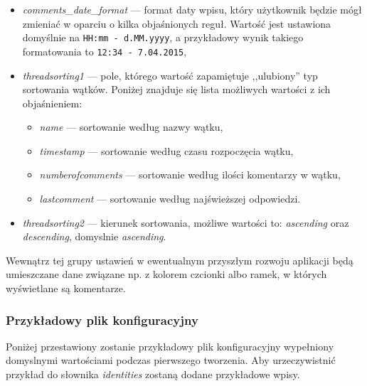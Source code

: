 \documentclass[polish,a4paper,twoside]{ppfcmthesis}
\begin{document}
\begin{itemize}[noitemsep]
  \item \emph{comments\_date\_format} --- format daty wpisu, który użytkownik będzie mógł zmieniać w oparciu o kilka objaśnionych reguł. Wartość jest ustawiona domyślnie na \texttt{HH:mm - d.MM.yyyy}, a przykładowy wynik takiego formatowania to \texttt{12:34 - 7.04.2015},
  \item \emph{threadsorting1} --- pole, którego wartość zapamiętuje ,,ulubiony'' typ sortowania wątków. Poniżej znajduje się lista możliwych wartości z ich objaśnieniem:
  
  \begin{itemize}[noitemsep]
    \item \emph{name} --- sortowanie według nazwy wątku,
    \item \emph{timestamp} --- sortowanie według czasu rozpoczęcia wątku,
    \item \emph{numberofcomments} --- sortowanie według ilości komentarzy w wątku,
    \item \emph{lastcomment} --- sortowanie według najświeższej odpowiedzi.
  \end{itemize}
  
  \item \emph{threadsorting2} --- kierunek sortowania, możliwe wartości to: \emph{ascending} oraz \emph{descending}, domyslnie \emph{ascending}.
\end{itemize}

Wewnątrz tej grupy ustawień w ewentualnym przyszłym rozwoju aplikacji będą umieszczane dane związane np. z kolorem czcionki albo ramek, w których wyświetlane są komentarze.

\subsubsection*{Przykładowy plik konfiguracyjny}

Poniżej przestawiony zostanie przykładowy plik konfiguracyjny wypełniony domyslnymi wartościami podczas pierwszego tworzenia. Aby urzeczywistnić przykład do słownika \emph{identities} zostaną dodane przykładowe wpisy.
\end{document}
